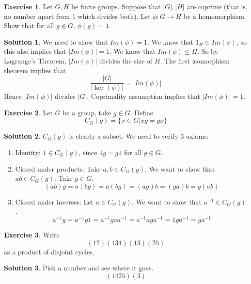 \documentclass[12pt]{article}
\theoremstyle{definition}
\newtheorem{exercise}{\color{YellowOrange}Exercise}
\theoremstyle{definition}
\newtheorem{solution}{\color{Goldenrod}Solution}
\begin{document}
\begin{exercise}
	Let $G,H$ be finite groups. Suppose that $|G|, |H|$ are coprime (that is, no number apart from 1 which divides both). Let $\phi : G \to H$ be a homomorphism. Show that for all $g \in G$, $\phi(g) = 1$. 
\end{exercise}
\begin{solution}
	We need to show that $Im (\phi) = 1$. We know that $1_H \in Im (\phi)$, so this also implies that $|Im (\phi)| = 1$. We know that $Im (\phi) \leq H$. So by Lagrange's Theorem, $|Im (\phi)|$ divides the size of $H$.  The first isomorphism theorem implies that
	\begin{equation}
		\frac{|G|}{|\ker (\phi)|} = |Im(\phi)| 
	\end{equation}
	Hence $|Im(\phi)| $ divides $|G|$. Coprimality assumption implies that $|Im (\phi)| = 1$.
\end{solution}

\begin{exercise}
	Let $G$ be a group, take $g \in G$. Define 
	\begin{equation}
		C_G(g) = \{x \in G | xg=gx\}
	\end{equation}
\end{exercise}
\begin{solution}
	$C_G(g)$ is clearly a subset. We need to verify 3 axioms:
	\begin{enumerate}
		\item Identity: $1 \in C_G(g)$, since $1g = g1$ for all $g \in G$.
		\item Closed under products: Take $a,b \in C_G(g)$. We want to show that $ab \in C_G(g)$. Take $g \in G$. 
		\begin{equation}
			(ab)g = a(bg) = a(bg) = (ag)b = (ga)b = g(ab)
		\end{equation}
		\item Closed under inverses: Let $a \in C_G(g)$. We want to show that $a^{-1} \in C_G(g)$. 
		\begin{equation}
			a^{-1} g = a^{-1}g1 = a^{-1}g aa^{-1} = a^{-1}aga^{-1} = 1 ga^{-1} = ga^{-1}
		\end{equation}
	\end{enumerate}
\end{solution}

\begin{exercise}
	Write 
	\begin{equation}
		(12)(134)(13)(25)
	\end{equation}
	as a product of disjoint cycles. 
\end{exercise}
\begin{solution}
	Pick a number and see where it goes. 
	\begin{equation}
		(1425)(3)
	\end{equation}
\end{solution}
\end{document}
